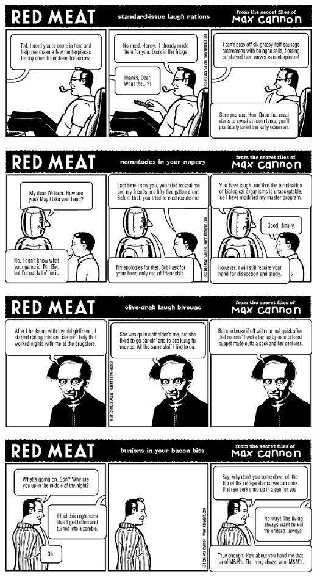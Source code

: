 \documentclass[a4paper,twoside,11pt]{article}
\begin{document}
\includegraphics[width=\textwidth]{redmeat_2004-08-31.png}



\includegraphics[width=\textwidth]{redmeat_2004-09-07.png}



\includegraphics[width=\textwidth]{redmeat_2004-09-14.png}



\includegraphics[width=\textwidth]{redmeat_2004-09-21.png}
\end{document}
